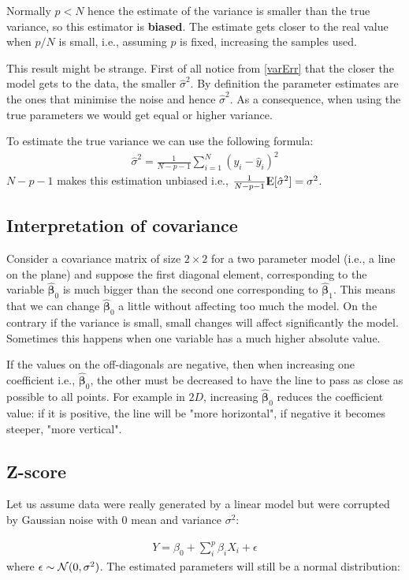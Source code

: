 \documentclass[12pt, letterpaper]{article}
\theoremstyle{definition}
\newcommand{\E}{{\rm I\kern-.3em E}}
\newcommand{\hs}{\hat{\sigma}^2}
\newcommand{\hb}{\mathrm{\hat{\mathbf{\beta}}}}
\begin{document}
Normally $p<N$ hence the estimate of the variance is smaller than the true variance, so this estimator is \textbf{biased}. The estimate gets closer to the real value when $p/N$ is small, i.e., assuming $p$ is fixed, increasing the samples used. 

This result might be strange. First of all notice from \autoref{varErr} that the closer the model gets to the data, the smaller $\hs$. By definition the parameter estimates are the ones that minimise the noise and hence $\hs$. As a consequence, when using the true parameters we would get equal or higher variance.

To estimate the true variance we can use the following formula:
\begin{align}
\hat{\sigma}^2 = \frac{1}{N-p-1}\sum_{i=1}^{N}(y_i-\hat{y}_i)^2
\end{align}
$N-p-1$ makes this estimation unbiased i.e., $\frac{1}{N-p-1}\E[\hat{\sigma}^2] =\sigma^2$.

\subsection{Interpretation of covariance}
Consider a covariance matrix of size $2\times 2$ for a two parameter model (i.e., a line on the plane) and suppose the first diagonal element, corresponding to the variable $\hb_0$ is much bigger than the second one corresponding to $\hb_1$. This means that we can change $\hb_0$ a little without affecting too much the model. On the contrary if the variance is small, small changes will affect significantly the model. Sometimes this happens when one variable has a much higher absolute value.

If the values on the off-diagonals are negative, then when increasing one coefficient i.e., $\hb_0$, the other must be decreased to have the line to pass as close as possible to all points. For example in $2D$, increasing $\hb_0$ reduces the coefficient value: if it is positive, the line will be "more horizontal", if negative it becomes steeper, "more vertical".
\subsection{Z-score}
Let us assume data were really generated by a linear model but were corrupted by Gaussian noise with $0$ mean and variance $\sigma^2$:

\begin{align}
Y = \beta_0 +\sum_i^p \beta_i X_i + \epsilon
\end{align} 
where $\epsilon \sim \CMcal{N}(0,\sigma^2)$.
The estimated parameters will still be a normal distribution:
\end{document}

